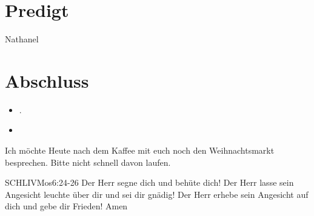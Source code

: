 \documentclass[fontsize=16pt]{mybib}
\newcommand{\Name}{Nathanel}
\begin{document}
\section{Predigt}
    \Name
\section{Abschluss}
\begin{itemize}
    \item {}.
    \item {}
\end{itemize}
Ich möchte Heute nach dem Kaffee mit euch noch den Weihnachtsmarkt besprechen. Bitte nicht schnell davon laufen.
\begin{bibelbox}{SCHL}{IVMos}{6:24-26}
    Der Herr segne dich und behüte dich!
    Der Herr lasse sein Angesicht leuchte über dir 
    und sei dir gnädig!
    Der Herr erhebe sein Angesicht auf dich
    und gebe dir Frieden! Amen
\end{bibelbox}
\end{document}
